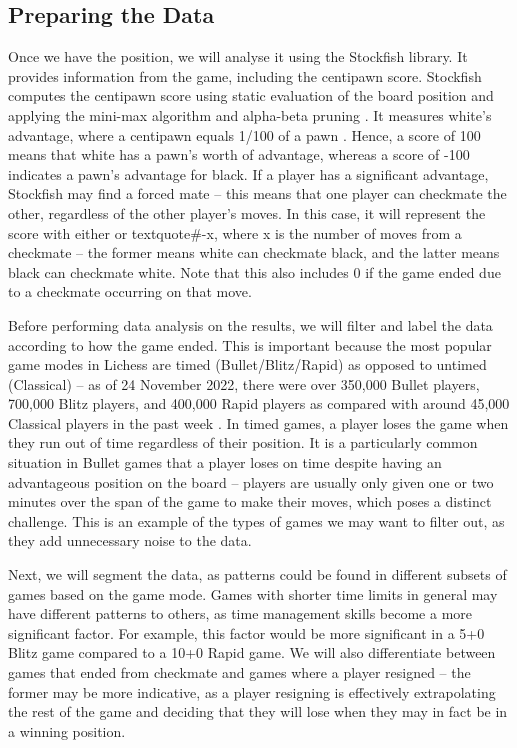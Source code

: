\documentclass[%
 superscriptaddress,
showpacs,preprintnumbers,
 amsmath,
 amssymb,
 aps,
 pra,
showkeys,
onecolumn,
notitlepage,
11pt,
tightenlines      %
]{revtex4-1}
\begin{document}
\subsection{Preparing the Data}
Once we have the position, we will analyse it using the Stockfish library. It provides information from the game, including the centipawn score. Stockfish computes the centipawn score using static evaluation of the board position and applying the mini-max algorithm and alpha-beta pruning \cite{maharaj2022chess}. It measures white's advantage, where a centipawn equals 1/100 of a pawn \cite{centipawnDefinition}. Hence, a score of 100 means that white has a pawn's worth of advantage, whereas a score of -100 indicates a pawn's advantage for black. If a player has a significant advantage, Stockfish may find a forced mate -- this means that one player can checkmate the other, regardless of the other player's moves. In this case, it will represent the score with either  or textquote{\#{-x}}, where x is the number of moves from a checkmate -- the former means white can checkmate black, and the latter means black can checkmate white. Note that this also includes 0 if the game ended due to a checkmate occurring on that move.

Before performing data analysis on the results, we will filter and label the data according to how the game ended. This is important because the most popular game modes in Lichess are timed (Bullet/Blitz/Rapid) as opposed to untimed (Classical) -- as of 24 November 2022, there were over 350,000 Bullet players, 700,000 Blitz players, and 400,000 Rapid players as compared with around 45,000 Classical players in the past week \cite{lichessBlitzRatingDistribution}. In timed games, a player loses the game when they run out of time regardless of their position. It is a particularly common situation in Bullet games that a player loses on time despite having an advantageous position on the board -- players are usually only given one or two minutes over the span of the game to make their moves, which poses a distinct challenge. This is an example of the types of games we may want to filter out, as they add unnecessary noise to the data.

Next, we will segment the data, as patterns could be found in different subsets of games based on the game mode. Games with shorter time limits in general may have different patterns to others, as time management skills become a more significant factor. For example, this factor would be more significant in a 5+0 Blitz game compared to a 10+0 Rapid game. We will also differentiate between games that ended from checkmate and games where a player resigned -- the former may be more indicative, as a player resigning is effectively extrapolating the rest of the game and deciding that they will lose when they may in fact be in a winning position.
\end{document}
